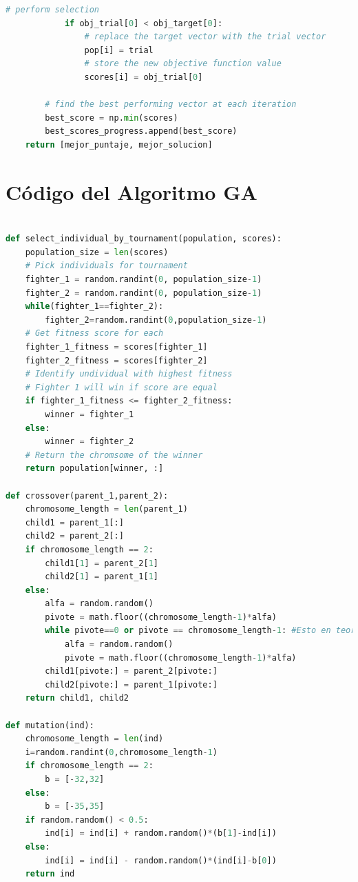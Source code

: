 \documentclass[10pt]{article}
\begin{document}
\begin{lstlisting}[language=Python]
            # perform selection
            if obj_trial[0] < obj_target[0]:
                # replace the target vector with the trial vector
                pop[i] = trial
                # store the new objective function value
                scores[i] = obj_trial[0]
                
        # find the best performing vector at each iteration
        best_score = np.min(scores)    
        best_scores_progress.append(best_score)
    return [mejor_puntaje, mejor_solucion]

\end{lstlisting}

\section*{Código del Algoritmo GA}
\begin{lstlisting}[language=Python]

def select_individual_by_tournament(population, scores):
    population_size = len(scores)
    # Pick individuals for tournament
    fighter_1 = random.randint(0, population_size-1)
    fighter_2 = random.randint(0, population_size-1)
    while(fighter_1==fighter_2):
        fighter_2=random.randint(0,population_size-1)
    # Get fitness score for each
    fighter_1_fitness = scores[fighter_1]
    fighter_2_fitness = scores[fighter_2]
    # Identify undividual with highest fitness
    # Fighter 1 will win if score are equal
    if fighter_1_fitness <= fighter_2_fitness:
        winner = fighter_1
    else:
        winner = fighter_2
    # Return the chromsome of the winner
    return population[winner, :]

def crossover(parent_1,parent_2):
    chromosome_length = len(parent_1)
    child1 = parent_1[:]
    child2 = parent_2[:]
    if chromosome_length == 2:
        child1[1] = parent_2[1]
        child2[1] = parent_1[1]
    else:
        alfa = random.random()
        pivote = math.floor((chromosome_length-1)*alfa)
        while pivote==0 or pivote == chromosome_length-1: #Esto en teoria nunca pasa
            alfa = random.random()
            pivote = math.floor((chromosome_length-1)*alfa)
        child1[pivote:] = parent_2[pivote:]
        child2[pivote:] = parent_1[pivote:]
    return child1, child2

def mutation(ind):
    chromosome_length = len(ind)
    i=random.randint(0,chromosome_length-1)
    if chromosome_length == 2:
        b = [-32,32]
    else:
        b = [-35,35]
    if random.random() < 0.5:
        ind[i] = ind[i] + random.random()*(b[1]-ind[i])
    else:
        ind[i] = ind[i] - random.random()*(ind[i]-b[0])
    return ind


\end{lstlisting}
\end{document}
